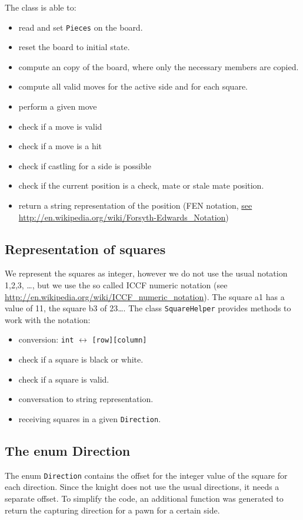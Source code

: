 \documentclass [12pt ,a4paper, naustrian]{scrartcl}
\theoremstyle{plain}
\theoremstyle{definition}
\theoremstyle{remark}
\begin{document}
		The class is able to:
		\begin{itemize}
			\item read and set \verb+Pieces+ on the board.
			\item reset the board to initial state. 
			\item compute an copy of the board, where only the necessary members are copied.
			\item compute all valid moves for the active side and for each square.
			\item perform a given move
			\item check if a move is valid
			\item check if a move is a hit
			\item check if castling for a side is possible
			\item check if the current position is a check, mate or stale mate position.
			\item return a string representation of the position (FEN notation, \url{see http://en.wikipedia.org/wiki/Forsyth-Edwards_Notation})
			
		\end{itemize}
		
	\subsection{Representation of squares}
	\label{sec:squares}
	We represent the squares as integer, however we do not use the usual notation 1,2,3, \ldots , but we use the so called ICCF numeric notation (see \url{http://en.wikipedia.org/wiki/ICCF_numeric_notation}). The square a1 has a value of 11, the square b3 of 23\ldots . The class \verb+SquareHelper+ provides methods to work with the notation:
	\begin{itemize}
		\item conversion: \verb+int+ $\leftrightarrow$ \verb+[row][column]+
		\item check if a square is black or white.
		\item check if a square is valid.
		\item conversation to string representation.
		\item receiving squares in a given \verb+Direction+.
	\end{itemize}
		
	\subsection{The enum Direction}
		The enum \verb+Direction+ contains the offset for the integer value of the square for each direction. Since the knight does not use the usual directions, it needs a separate offset. To simplify the code, an additional function was generated to return the capturing direction for a pawn for a certain side.
\end{document}
